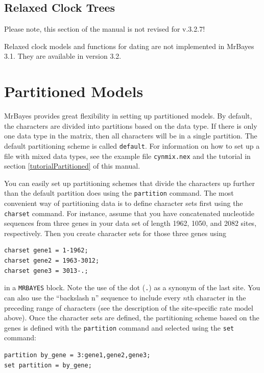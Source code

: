 \documentclass[12pt]{book}
\begin{document}
\subsection{Relaxed Clock Trees}
{\large\color{red} Please note, this section of the manual is not revised for v.3.2.7!}

Relaxed clock models and functions for dating are not implemented in MrBayes 3.1. They are
available in version 3.2.

\section{Partitioned Models}
\label{partitionedModels}

MrBayes provides great flexibility in setting up partitioned models. By default, the characters are
divided into partitions based on the data type. If there is only one data type in the matrix, then
all characters will be in a single partition. The default partitioning scheme is called
\texttt{default}. For information on how to set up a file with mixed data types, see the example
file \texttt{cynmix.nex} and the tutorial in section \ref{tutorialPartitioned} of this manual.

You can easily set up partitioning schemes that divide the characters up further than the default
partition does using the \texttt{partition} command. The most convenient way of partitioning data
is to define character sets first using the \texttt{charset} command. For instance, assume that you
have concatenated nucleotide sequences from three genes in your data set of length 1962, 1050, and
2082 sites, respectively. Then you create character sets for those three genes using

\begin{Verbatim}
charset gene1 = 1-1962;
charset gene2 = 1963-3012;
charset gene3 = 3013-.;
\end{Verbatim}

in a \texttt{MRBAYES} block. Note the use of the dot (\texttt{.}) as a synonym of the last site.
You can also use the ``backslash n'' sequence to include every $n$th character in the preceding
range of characters (see the description of the site-specific rate model above). Once the character
sets are defined, the partitioning scheme based on the genes is defined with the \texttt{partition}
command and selected using the \texttt{set} command:

\begin{Verbatim}
partition by_gene = 3:gene1,gene2,gene3;
set partition = by_gene;
\end{Verbatim}
\end{document}
